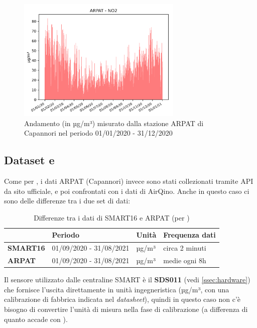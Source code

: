 \begin{figure}[H]
\centering
\captionsetup{justification=centering}
\includegraphics[width=0.70\textwidth,height=\textheight,keepaspectratio]{img/lu-capannori_no2_2020_cleaned_no2.png}
\caption{Andamento  (in µg/m³) misurato dalla stazione ARPAT di Capannori nel periodo 01/01/2020 - 31/12/2020}
\label{fig:arpat-no2}
\end{figure}
\clearpage

\subsection{Dataset  e }\label{ssec:dataset-pm}
Come per , i dati ARPAT (Capannori) invece sono stati collezionati tramite API da sito ufficiale, e poi confrontati con i dati di AirQino.
Anche in questo caso ci sono delle differenze tra i due set di dati:\\

\begin{table}[H]
\centering
\def\arraystretch{0.9}
\begin{tabular}{|l|l|l|l|}
\cline{2-4}
\multicolumn{1}{c|}{} & \textbf{Periodo} & \textbf{Unità} & \textbf{Frequenza dati} \\ \hline
\textbf{SMART16} & 01/09/2020 - 31/08/2021 & µg/m³ & circa 2 minuti \\ \hline
\textbf{ARPAT} & 01/09/2020 - 31/08/2021 & µg/m³ & medie ogni 8h \\ \hline
\end{tabular}
\captionsetup{justification=centering}
\caption{Differenze tra i dati di SMART16 e ARPAT (per )}
\label{tab:dataset-no2-tabella}
\end{table}

Il sensore utilizzato dalle centraline SMART è il \textbf{SDS011} (vedi \ref{ssec:hardware}) che fornisce l'uscita direttamente in unità ingegneristica (µg/m³, con una calibrazione di fabbrica indicata nel \textit{datasheet}), quindi in questo caso non c'è bisogno di convertire l'unità di misura nella fase di calibrazione (a differenza di quanto accade con ).

